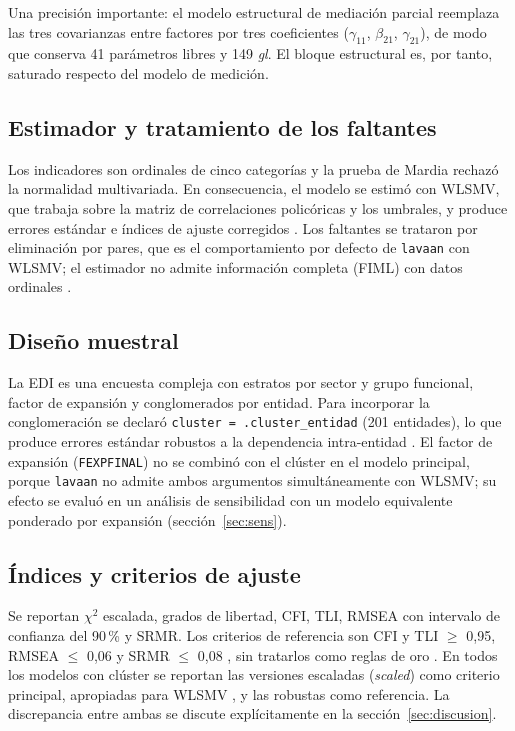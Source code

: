 \documentclass[11pt,a4paper]{article}
\newcommand{\chisq}{$\chi^2$}
\newcommand{\df}{\textit{gl}}
\begin{document}
Una precisión importante: el modelo estructural de mediación parcial reemplaza las tres
covarianzas entre factores por tres coeficientes ($\gamma_{11}$, $\beta_{21}$,
$\gamma_{21}$), de modo que conserva 41 parámetros libres y 149 \df. El bloque estructural
es, por tanto, saturado respecto del modelo de medición.

\subsection{Estimador y tratamiento de los faltantes}

Los indicadores son ordinales de cinco categorías y la prueba de Mardia rechazó la
normalidad multivariada. En consecuencia, el modelo se estimó con WLSMV, que trabaja sobre
la matriz de correlaciones policóricas y los umbrales, y produce errores estándar e índices
de ajuste corregidos \citep{li2016,xia2019}. Los faltantes se trataron por eliminación por
pares, que es el comportamiento por defecto de \texttt{lavaan} con WLSMV; el estimador no
admite información completa (FIML) con datos ordinales \citep{enders2022}.

\subsection{Diseño muestral}

La EDI es una encuesta compleja con estratos por sector y grupo funcional, factor de
expansión y conglomerados por entidad. Para incorporar la conglomeración se declaró
\texttt{cluster = .cluster\_entidad} (201 entidades), lo que produce errores estándar
robustos a la dependencia intra-entidad \citep{oberski2014}. El factor de expansión
(\texttt{FEXPFINAL}) no se combinó con el clúster en el modelo principal, porque
\texttt{lavaan} no admite ambos argumentos simultáneamente con WLSMV; su efecto se evaluó en
un análisis de sensibilidad con un modelo equivalente ponderado por expansión
(sección~\ref{sec:sens}).

\subsection{Índices y criterios de ajuste}

Se reportan \chisq{} escalada, grados de libertad, CFI, TLI, RMSEA con intervalo de confianza
del 90\,\% y SRMR. Los criterios de referencia son CFI y TLI $\geq$ 0,95, RMSEA $\leq$ 0,06
y SRMR $\leq$ 0,08 \citep{hu1999}, sin tratarlos como reglas de oro \citep{marsh2004}. En
todos los modelos con clúster se reportan las versiones escaladas (\textit{scaled}) como
criterio principal, apropiadas para WLSMV \citep{xia2019}, y las robustas como referencia.
La discrepancia entre ambas se discute explícitamente en la sección~\ref{sec:discusion}.
\end{document}
